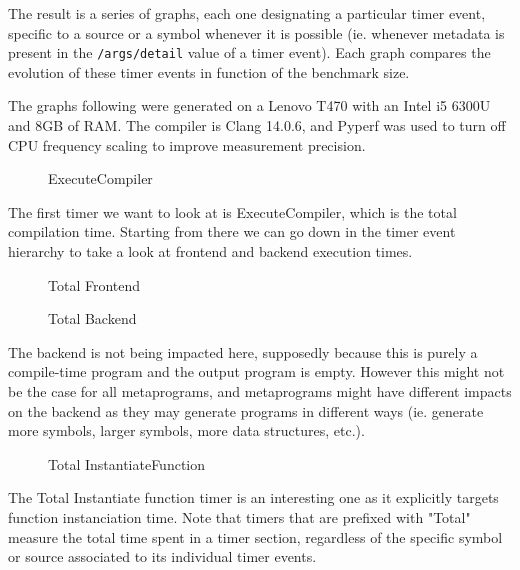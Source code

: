\documentclass[../main]{subfiles}
\begin{document}
The result is a series of graphs, each one designating a particular timer event,
specific to a source or a symbol whenever it is possible (ie. whenever metadata
is present in the \lstinline{/args/detail} value of a timer event). Each graph
compares the evolution of these timer events in function of the benchmark size.

The graphs following were generated on a Lenovo T470 with an Intel i5 6300U and
8GB of RAM. The compiler is Clang 14.0.6, and Pyperf \cite{pyperf} was used
to turn off CPU frequency scaling to improve measurement precision.

\begin{figure}[h]
\fontsize{8}{10}\selectfont

\caption{ExecuteCompiler}
\end{figure}

The first timer we want to look at is ExecuteCompiler, which is the total
compilation time. Starting from there we can go down in the timer event
hierarchy to take a look at frontend and backend execution times.

\begin{figure}[h]
\fontsize{8}{10}\selectfont

\caption{Total Frontend}
\end{figure}

\begin{figure}[h]
\fontsize{8}{10}\selectfont

\caption{Total Backend}
\end{figure}

The backend is not being impacted here, supposedly because this is purely a
compile-time program and the output program is empty. However this might not be
the case for all metaprograms, and metaprograms might have different impacts on
the backend as they may generate programs in different ways (ie. generate more
symbols, larger symbols, more data structures, etc.).

\begin{figure}[h]
\fontsize{8}{10}\selectfont

\caption{Total InstantiateFunction}
\end{figure}

The Total Instantiate function timer is an interesting one as it explicitly
targets function instanciation time. Note that timers that are prefixed with
"Total" measure the total time spent in a timer section, regardless of the
specific symbol or source associated to its individual timer events.
\end{document}
